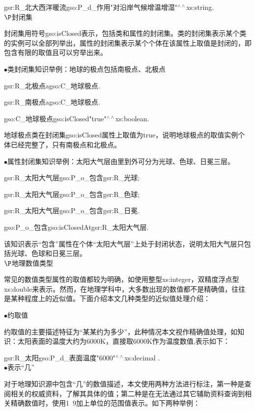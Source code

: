 gsr:R\_北大西洋暖流\quad gso:P\_d\_作用\quad "对沿岸气候增温增湿"$^{\land\land}$xs:string\quad .
	\\
	
$\P$封闭集

封闭集用符号gso:isClosed表示，包括类和属性的封闭集。类的封闭集表示某个类的实例可以全部列举出，属性的封闭集表示某个个体在该属性上取值是封闭的，即包含有限的取值且可以穷举出来。

	$\bullet$类封闭集知识举例：地球的极点包括南极点、北极点

gsr:R\_北极点\quad a\quad gso:C\_地球极点\quad .

gsr:R\_南极点\quad a\quad gso:C\_地球极点\quad .

gso:C\_地球极点\quad gso:isClosed\quad "true"$^{\land\land}$xs:boolean\quad .

地球极点类在封闭集gso:isClosed属性上取值为true，说明地球极点的取值实例个体已经完整了，只有南极点和北极点。

$\bullet$属性封闭集知识举例：太阳大气层由里到外可分为光球、色球、日冕三层。

gsr:R\_太阳大气层\quad gso:P\_o\_包含\quad gsr:R\_光球\quad ;

gsr:R\_太阳大气层\quad gso:P\_o\_包含\quad gsr:R\_色球\quad ;

gsr:R\_太阳大气层\quad gso:P\_o\_包含\quad gsr:R\_日冕\quad .

gso:P\_o\_包含\quad gso:isClosedAt\quad gsr:R\_太阳大气层\quad.

该知识表示“包含”属性在个体“太阳大气层”上处于封闭状态，说明太阳大气层只包括光球、色球和日冕三层。
	\\

$\P$地理数值类型

常见的数值类型属性的取值都较为明确，如使用整型xs:integer，双精度浮点型xs:double来表示。然而，在地理学科中，大多数出现的数值都不是精确值，往往是某种程度上的近似值。下面介绍本文几种类型的近似值处理介绍：

$\bullet$约取值

约取值的主要描述特征为“某某约为多少”，此种情况本文视作精确值处理，如知识：太阳表面的温度大约为6000K，直接取6000K作为温度数值,表示如下：

gsr:R\_太阳\quad gso:P\_d\_表面温度\quad "6000"$^{\land\land}$xs:decimal .
\\

$\bullet$表示“几”

对于地理知识源中包含“几”的数值描述，本文使用两种方法进行标注，第一种是查阅相关的权威资料，了解其具体的值；第二种是在无法通过其它辅助资料查询到相关精确数值时，使用1~9加上单位的范围值表示。如下两种举例：

